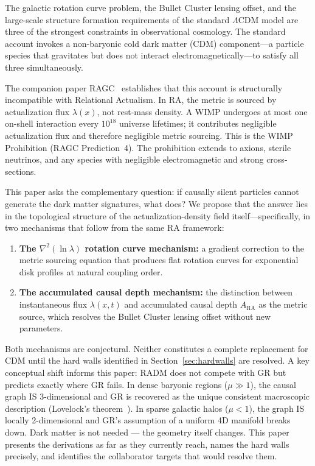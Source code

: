 \documentclass[11pt,a4paper]{article}
\theoremstyle{plain}
\theoremstyle{definition}
\theoremstyle{remark}
\begin{document}
The galactic rotation curve problem, the Bullet Cluster lensing offset, and the
large-scale structure formation requirements of the standard $\Lambda$CDM model
are three of the strongest constraints in observational cosmology. The standard
account invokes a non-baryonic cold dark matter (CDM) component---a particle
species that gravitates but does not interact electromagnetically---to satisfy all
three simultaneously.

The companion paper RAGC~\citep{Sandeman2026b} establishes that this account is
structurally incompatible with Relational Actualism. In RA, the metric is sourced
by actualization flux $\lambda(x)$, not rest-mass density. A WIMP undergoes at
most one on-shell interaction every $10^{18}$ universe lifetimes; it contributes
negligible actualization flux and therefore negligible metric sourcing. This is the
WIMP Prohibition (RAGC Prediction~4). The prohibition extends to axions, sterile
neutrinos, and any species with negligible electromagnetic and strong cross-sections.

This paper asks the complementary question: if causally silent particles cannot
generate the dark matter signatures, what does? We propose that the answer lies in
the topological structure of the actualization-density field itself---specifically,
in two mechanisms that follow from the same RA framework:

\begin{enumerate}[noitemsep]
  \item \textbf{The $\nabla^2(\ln\lambda)$ rotation curve mechanism:} a gradient
  correction to the metric sourcing equation that produces flat rotation curves
  for exponential disk profiles at natural coupling order.
  \item \textbf{The accumulated causal depth mechanism:} the distinction between
  instantaneous flux $\lambda(x,t)$ and accumulated causal depth $A_{\mathrm{RA}}$
  as the metric source, which resolves the Bullet Cluster lensing offset without
  new parameters.
\end{enumerate}

Both mechanisms are conjectural. Neither constitutes a complete replacement for
CDM until the hard walls identified in Section~\ref{sec:hardwalls} are resolved.
A key conceptual shift informs this paper: RADM does not compete with GR
but predicts exactly where GR fails. In dense baryonic regions ($\mu \gg 1$),
the causal graph IS 3-dimensional and GR is recovered as the unique
consistent macroscopic description (Lovelock's theorem~\citep{Sandeman2026b}).
In sparse galactic halos ($\mu < 1$), the graph IS locally 2-dimensional
and GR's assumption of a uniform 4D manifold breaks down. Dark matter is not
needed --- the geometry itself changes. This paper presents the derivations
as far as they currently reach, names the hard walls precisely, and identifies
the collaborator targets that would resolve them.
\end{document}
